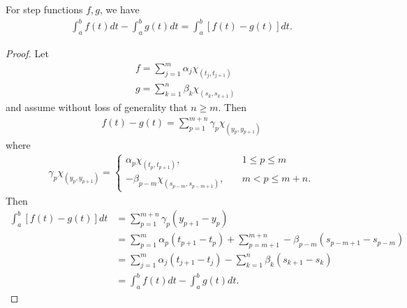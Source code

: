 %
%
%
%
%
%
%
%
\begin{lemma}
For step functions $f, g$, we have
%
%
\begin{equation*}
\begin{split}
  \int_{a}^{b} f(t) dt - \int_{a}^{b} g(t) dt = \int_{a}^{b}\left[ f(t) - g(t) \right]dt.
\end{split}
\end{equation*}
%
%
\label{lem:indep-part}
\end{lemma}
%
%
\begin{proof}
%
Let
%
\begin{equation*}
\begin{split}
  & f = \sum_{j=1}^{m}\alpha_{j} \chi_{(t_{j}, t_{j+1})}
  \\
  & g = \sum_{k =1}^{n}
  \beta_{k} \chi_{(s_{k}, s_{k+1})}
\end{split}
\end{equation*}
%
and assume without loss of generality that $n \ge m$. 
Then
%
%
\begin{equation*}
\begin{split}
  f(t) - g(t) = \sum_{p=1}^{m+n} \gamma_{p} \chi_{(y_{p}, y_{p+1})} 
\end{split}
\end{equation*}
%
%
where
\begin{equation*}
  \begin{split}
    \gamma_{p} \chi_{(y_{p}, y_{p+1}) } = 
    \begin{cases}
      \alpha_{p} \chi_{(t_{p}, t_{p+1})}
, \quad & 1 \le p \le m \\
-\beta_{p-m} \chi_{(s_{p-m}, s_{p-m+1})}, \quad & m < p \le m+n.
\end{cases}
\end{split}
\end{equation*}
Then
%
%
%
\begin{equation*}
\begin{split}
  \int_{a}^{b}\left[ f(t) - g(t) \right]dt
  & = \sum_{p=1}^{m+n}
  \gamma_{p}(y_{p+1} - y_{p})
  \\
  & = \sum_{p=1}^{m} \alpha_{p}(t_{p+1} - t_{p}) +
  \sum_{p=m+1}^{m+n}-\beta_{p-m}(s_{p-m+1} - s_{p-m})
  \\
  & = \sum_{j=1}^{m}\alpha_{j}(t_{j+1} - t_{j}) -
  \sum_{k=1}^{n}\beta_{k}(s_{k+1} - s_{k})
  \\
  & = \int_{a}^{b}f(t)dt - \int_{a}^{b} g(t) dt.
\end{split}
\end{equation*}
%
%
%
%
\end{proof}
